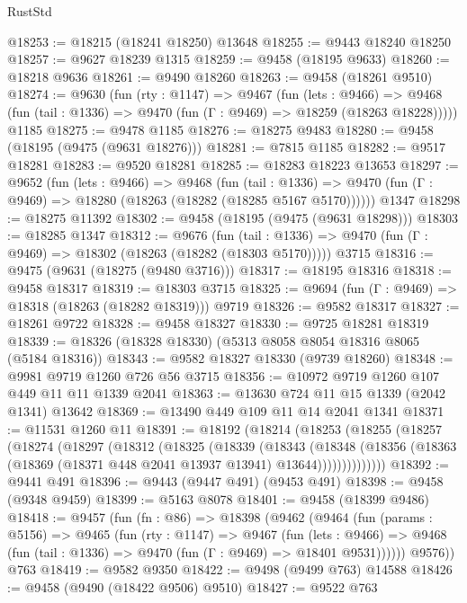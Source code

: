 \begin{lexlean}{RustStd}
\begin{coremodule}
@18253 := @18215 (@18241 @18250) @13648
@18255 := @9443 @18240 @18250
@18257 := @9627 @18239 @1315
@18259 := @9458 (@18195 @9633)
@18260 := @18218 @9636
@18261 := @9490 @18260
@18263 := @9458 (@18261 @9510)
@18274 := @9630
    (fun (rty : @1147) =>
    @9467
      (fun (lets : @9466) =>
      @9468 (fun (tail : @1336) => @9470 (fun (Γ : @9469) => @18259 (@18263 @18228)))))
    @1185
@18275 := @9478 @1185
@18276 := @18275 @9483
@18280 := @9458 (@18195 (@9475 (@9631 @18276)))
@18281 := @7815 @1185
@18282 := @9517 @18281
@18283 := @9520 @18281
@18285 := @18283 @18223 @13653
@18297 := @9652
    (fun (lets : @9466) =>
    @9468
      (fun (tail : @1336) =>
      @9470 (fun (Γ : @9469) => @18280 (@18263 (@18282 (@18285 @5167 @5170))))))
    @1347
@18298 := @18275 @11392
@18302 := @9458 (@18195 (@9475 (@9631 @18298)))
@18303 := @18285 @1347
@18312 := @9676
    (fun (tail : @1336) => @9470 (fun (Γ : @9469) => @18302 (@18263 (@18282 (@18303 @5170)))))
    @3715
@18316 := @9475 (@9631 (@18275 (@9480 @3716)))
@18317 := @18195 @18316
@18318 := @9458 @18317
@18319 := @18303 @3715
@18325 := @9694 (fun (Γ : @9469) => @18318 (@18263 (@18282 @18319))) @9719
@18326 := @9582 @18317
@18327 := @18261 @9722
@18328 := @9458 @18327
@18330 := @9725 @18281 @18319
@18339 := @18326 (@18328 @18330) (@5313 @8058 @8054 @18316 @8065 (@5184 @18316))
@18343 := @9582 @18327 @18330 (@9739 @18260)
@18348 := @9981 @9719 @1260 @726 @56 @3715
@18356 := @10972 @9719 @1260 @107 @449 @11 @11 @1339 @2041
@18363 := @13630 @724 @11 @15 @1339 (@2042 @1341) @13642
@18369 := @13490 @449 @109 @11 @14 @2041 @1341
@18371 := @11531 @1260 @11
@18391 := @18192
    (@18214
      (@18253
        (@18255
          (@18257
            (@18274
              (@18297
                (@18312
                  (@18325
                    (@18339
                      (@18343
                        (@18348
                          (@18356
                            (@18363 (@18369 (@18371 @448 @2041 @13937 @13941) @13644))))))))))))))
@18392 := @9441 @491
@18396 := @9443 (@9447 @491) (@9453 @491)
@18398 := @9458 (@9348 @9459)
@18399 := @5163 @8078
@18401 := @9458 (@18399 @9486)
@18418 := @9457
    (fun (fn : @86) =>
    @18398
      (@9462
        (@9464
          (fun (params : @5156) =>
          @9465
            (fun (rty : @1147) =>
            @9467
              (fun (lets : @9466) =>
              @9468 (fun (tail : @1336) => @9470 (fun (Γ : @9469) => @18401 @9531))))))
        @9576))
    @763
@18419 := @9582 @9350
@18422 := @9498 (@9499 @763) @14588
@18426 := @9458 (@9490 (@18422 @9506) @9510)
@18427 := @9522 @763

\end{coremodule}
\end{lexlean}

